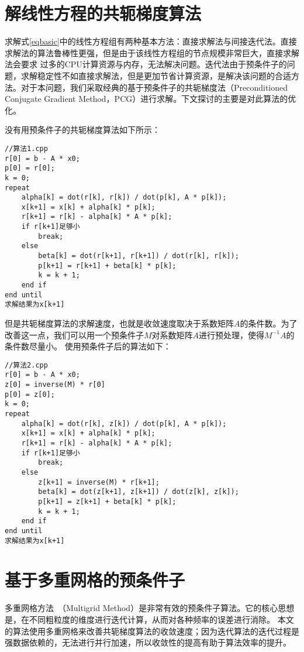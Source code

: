 \section{解线性方程的共轭梯度算法}

求解式\ref{eqbasic}中的线性方程组有两种基本方法：直接求解法与间接迭代法。直接求解法的算法鲁棒性更强，但是由于该线性方程组的节点规模非常巨大，直接求解法会要求
过多的CPU计算资源与内存，无法解决问题。迭代法由于预条件子的问题，求解稳定性不如直接求解法，但是更加节省计算资源，是解决该问题的合适方法。对于本问题，我们采取经典的基于预条件子的共轭梯度法（Preconditioned Conjugate Gradient Method，PCG）进行求解。下文探讨的主要是对此算法的优化。

没有用预条件子的共轭梯度算法如下所示：
\begin{lstlisting}
//算法1.cpp
r[0] = b - A * x0;
p[0] = r[0];
k = 0;
repeat
    alpha[k] = dot(r[k], r[k]) / dot(p[k], A * p[k]);
    x[k+1] = x[k] + alpha[k] * p[k];
    r[k+1] = r[k] - alpha[k] * A * p[k];
    if r[k+1]足够小
        break;
    else
        beta[k] = dot(r[k+1], r[k+1]) / dot(r[k], r[k]);
        p[k+1] = r[k+1] + beta[k] * p[k];
        k = k + 1;
    end if
end until
求解结果为x[k+1]
\end{lstlisting}

但是共轭梯度算法的求解速度，也就是收敛速度取决于系数矩阵$A$的条件数。为了改善这一点，我们可以用一个预条件子$M$对系数矩阵$A$进行预处理，使得$M^{-1}A$的条件数尽量小。
使用预条件子后的算法如下：
\begin{lstlisting}
//算法2.cpp
r[0] = b - A * x0;
z[0] = inverse(M) * r[0]
p[0] = z[0];
k = 0;
repeat
    alpha[k] = dot(r[k], z[k]) / dot(p[k], A * p[k]);
    x[k+1] = x[k] + alpha[k] * p[k];
    r[k+1] = r[k] - alpha[k] * A * p[k];
    if r[k+1]足够小
        break;
    else
        z[k+1] = inverse(M) * r[k+1];
        beta[k] = dot(z[k+1], z[k+1]) / dot(z[k], z[k]);
        p[k+1] = z[k+1] + beta[k] * p[k];
        k = k + 1;
    end if
end until
求解结果为x[k+1]
\end{lstlisting}

\section{基于多重网格的预条件子}

多重网格方法~\cite{trottenberg2000multigrid}（Multigrid Method）是非常有效的预条件子算法。它的核心思想是，在不同粗粒度的维度进行迭代计算，从而对各种频率的误差进行消除。
本文的算法使用多重网格来改善共轭梯度算法的收敛速度；因为迭代算法的迭代过程是强数据依赖的，无法进行并行加速，所以收敛性的提高有助于算法效率的提升。

